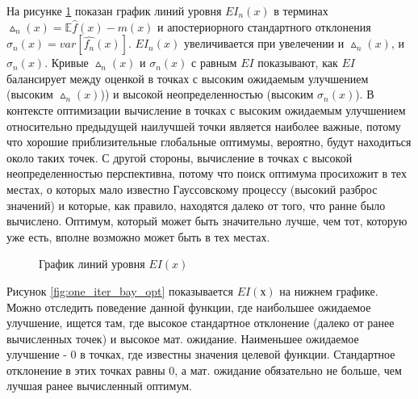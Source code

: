 На рисунке \ref{fig:contour_plot_EI} показан график линий уровня $EI_n(x)$ в терминах $\vartriangle_n (x) = \mathbb{E} \hat{f}(x)- m(x)$ и апостериорного стандартного отклонения $\sigma_n (x) = var[\hat{f_n}(x)]$. $EI_n(x)$ увеличивается при увелечении и $\vartriangle_n (x)$, и  $\sigma_n (x)$. Кривые $\vartriangle_n (x)$ и $\sigma_n (x)$ с равным $EI$ показывают, как $EI$ балансирует между оценкой в точках с высоким ожидаемым улучшением (высоким $\vartriangle_n (x)$)) и высокой неопределенностью (высоким $\sigma_n (x)$). В контексте оптимизации вычисление в точках с высоким ожидаемым улучшением относительно предыдущей наилучшей точки является наиболее важные, потому что хорошие приблизительные глобальные оптимумы, вероятно, будут находиться около таких точек. С другой стороны, вычисление в точках с высокой неопределенностью перспективна, потому что поиск оптимума просихожит в тех местах, о которых мало известно Гауссовскому процессу (высокий разброс значений) и которые, как правило, находятся далеко от того, что ранне было вычислено. Оптимум, который может быть значительно лучше, чем тот, которую уже есть, вполне возможно может быть в тех местах. \cite{bayess}

\begin{figure}[H]
	\captionsetup{justification=centering}
	\caption{График линий уровня $EI(x)$}
	\label{fig:contour_plot_EI}
\end{figure}

Рисунок \ref{fig:one_iter_bay_opt} показывается $EI(х)$ на нижнем графике. Можно отследить поведение данной функции, где наибольшее ожидаемое улучшение, ищется там, где высокое стандартное отклонение (далеко от ранее вычисленных точек) и высокое мат. ожидание. Наименьшее ожидаемое улучшение - 0 в точках, где известны значения целевой функции. Стандартное отклонение в этих точках равны 0, а мат. ожидание обязательно не больше, чем лучшая ранее вычисленный оптимум.

